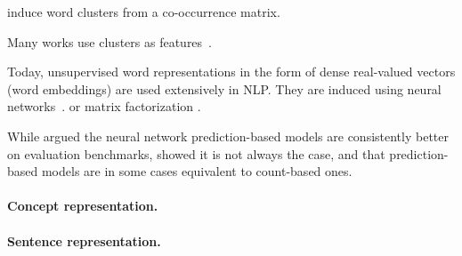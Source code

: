\documentclass{article}
\begin{document}
    \citet{pereira1993distributional} induce word clusters from a co-occurrence matrix.

    Many works use clusters as features~\cite{miller2004name,koo2008simple,huang2009distributional,zhao2009multilingual}.

    Today, unsupervised word representations in the form of dense real-valued vectors
    (word embeddings) are used extensively in NLP.
    They are induced using neural networks~\cite{bengio2003neural,mnih2007three,collobert2008unified,turian2010word,mikolov2013efficient}.
    or matrix factorization \cite{pennington2014glove}.
    
    While \citet{baroni2014don} argued the neural network prediction-based models are
consistently better on evaluation benchmarks, \citet{levy2015improving} showed
it is not always the case, and that prediction-based models are in some cases
equivalent to count-based ones.

    \paragraph{Concept representation.}


    \paragraph{Sentence representation.}


    
    
\end{document}
